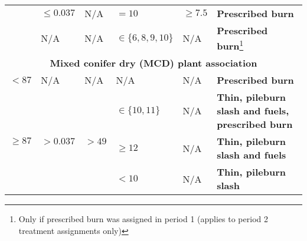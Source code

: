 \begin{longtable}{p{.1\linewidth}p{.1\linewidth}p{.15\linewidth}p{.15\linewidth}p{.2\linewidth}p{.25\linewidth}}
                                  & $ \le 0.037$                                        & N/A                                                 & $=10$                  & $\ge 7.5$                                                                                        & \textbf{Prescribed burn}                                                          \\ \cline{2-6} 
                                  & N/A                                                    & N/A                                                 & $\in \{6,8,9,10\}$            & N/A                                                                                                     & \textbf{Prescribed burn}\footnote{\label{footnote:p2TrtNote}Only if prescribed burn was assigned in period 1 (applies to period 2 treatment assignments only)} \\ \hline
\multicolumn{6}{c}{\textbf{Mixed conifer dry (MCD) plant association}}                                                                                                                                                                                                                                                                                                \\ \hline
$<87$                       & N/A                                                    & N/A                                                 & N/A                  & N/A                                                                                                     & \textbf{Prescribed burn}                                                          \\ \hline
\multirow{6}{*}{$ \ge 87$} & \multicolumn{1}{c}{\multirow{4}{*}{$ > 0.037$}} & \multicolumn{1}{c}{\multirow{3}{*}{$ >49$}} & $\in \{10,11\}$               & N/A                                                                                                     & \textbf{Thin, pileburn slash and fuels, prescribed burn}                          \\ \cline{4-6} 
                                  & \multicolumn{1}{c}{}                                   & \multicolumn{1}{c}{}                                & $\ge 12$      & N/A                                                                                                     & \textbf{Thin, pileburn slash and fuels}                                           \\ \cline{4-6} 
                                  & \multicolumn{1}{c}{}                                   & \multicolumn{1}{c}{}                                & $ < 10$          & N/A                                                                                                     & \textbf{Thin, pileburn slash}                                                     \\ \cline{3-6} 

\end{longtable}
